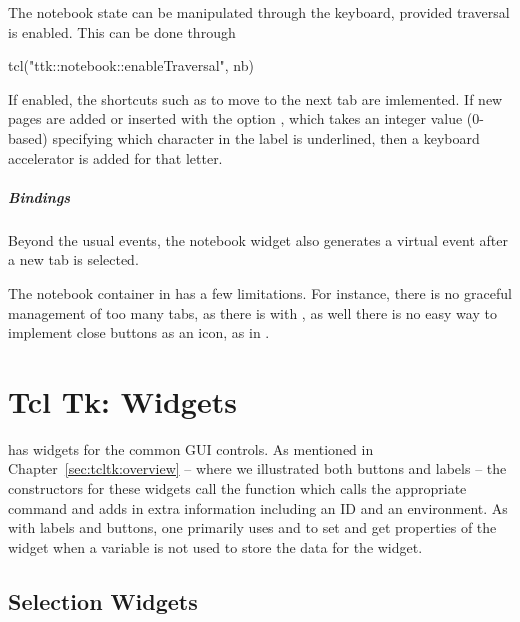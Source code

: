The notebook state can be manipulated through the keyboard, provided traversal is enabled. This can be done through
\begin{Schunk}
\begin{Sinput}
 tcl("ttk::notebook::enableTraversal", nb)
\end{Sinput}
\end{Schunk}

If enabled, the shortcuts such as  to move to the
next tab are imlemented. If new pages are added or inserted with the
option , which takes an integer value
(0-based) specifying which character in the label is underlined, then
a keyboard accelerator is added for that letter.

\paragraph{Bindings}
Beyond the usual events, the notebook widget also generates a
 virtual event after a new tab is
selected.

The notebook container in \TK\/ has a few limitations. For instance,
there is no graceful management of too many tabs, as there is with
\GTK, as well there is no easy way to implement close buttons as an
icon, as in \Qt.


\chapter{Tcl Tk: Widgets}
\label{sec:tcltk:widgets}

\Tk\/ has widgets for the common GUI controls. As mentioned in
Chapter~\ref{sec:tcltk:overview} -- where we illustrated both buttons
and labels -- the constructors for these widgets call the function
 which calls the appropriate \TK\/ command and adds
in extra information including an ID and an environment. As with
labels and buttons, one primarily uses  and
 to set and get properties of the widget when a
\TCL\/ variable is not used to store the data for the widget.




\section{Selection Widgets}
\label{sec:tcltk:selection-widgets}

